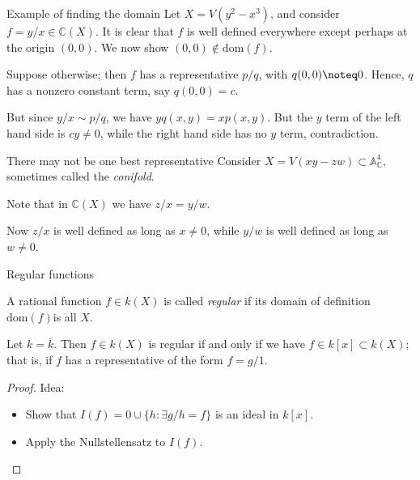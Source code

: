 \documentclass{beamer}
\newcommand{\C}{\mathbb{C}}
\newcommand{\A}{\mathbb{A}}
\begin{document}
\begin{frame}{Example of finding the domain}
  Let $X=V(y^2-x^3)$, and consider $f=y/x\in \C(X)$.  It is clear that $f$ is well defined everywhere except perhaps at the origin $(0,0)$.  We now show $(0,0)\notin \text{dom}(f)$.

  Suppose otherwise; then $f$ has a representative $p/q$, with $q(0,0)\noteq 0$. Hence, $q$ has a nonzero constant term, say $q(0,0)=c$.

  But since $y/x\sim p/q$, we have $yq(x,y)=xp(x,y)$.  But the $y$ term of the left hand side is $cy\neq 0$, while the right hand side has no $y$ term, contradiction.
  
  \end{frame}

\begin{frame}{There may not be one best representative}
  Consider $X=V(xy-zw)\subset \A^4_\C$, sometimes called the \emph{conifold}.

  Note that in $\C(X)$ we have $z/x=y/w$.

  Now $z/x$ is well defined as long as $x\neq 0$, while $y/w$ is well defined as long as $w\neq 0$.

  \end{frame}

\begin{frame}{Regular functions}
  \begin{definition}
    A rational function $f\in k(X)$ is called \emph{regular} if its domain of definition $\text{dom}(f)$is all $X$.
  \end{definition}

  \begin{lemma}Let $k=\overline{k}$.  Then $f\in k(X)$ is regular if and only if we have $f\in k[x]\subset k(X)$; that is, if $f$ has a representative of the form $f=g/1$.
  \end{lemma}

  \begin{proof}
    Idea:\begin{itemize}
    \item Show that $I(f)=0\cup\{h: \exists g/h=f\}$ is an ideal in $k[x]$.
    \item Apply the Nullstellensatz to $I(f)$.
    \end{itemize}
  \end{proof}
  \end{frame}
    
\end{document}
